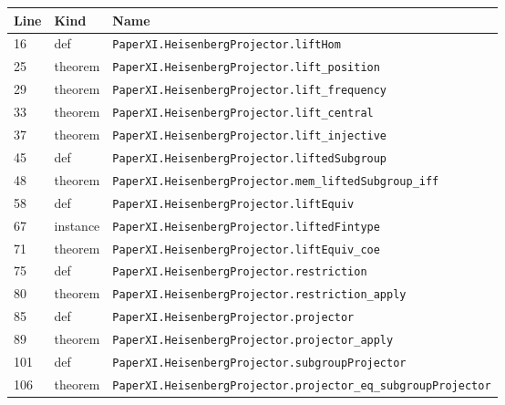 \documentclass[10pt,oneside]{book}
\begin{document}
\begin{longtable}{@{}p{}p{}p{}@{}}\toprule Line&Kind&Name\\\midrule\endhead

16&def&\nolinkurl{PaperXI.HeisenbergProjector.liftHom}\\

25&theorem&\nolinkurl{PaperXI.HeisenbergProjector.lift_position}\\

29&theorem&\nolinkurl{PaperXI.HeisenbergProjector.lift_frequency}\\

33&theorem&\nolinkurl{PaperXI.HeisenbergProjector.lift_central}\\

37&theorem&\nolinkurl{PaperXI.HeisenbergProjector.lift_injective}\\

45&def&\nolinkurl{PaperXI.HeisenbergProjector.liftedSubgroup}\\

48&theorem&\nolinkurl{PaperXI.HeisenbergProjector.mem_liftedSubgroup_iff}\\

58&def&\nolinkurl{PaperXI.HeisenbergProjector.liftEquiv}\\

67&instance&\nolinkurl{PaperXI.HeisenbergProjector.liftedFintype}\\

71&theorem&\nolinkurl{PaperXI.HeisenbergProjector.liftEquiv_coe}\\

75&def&\nolinkurl{PaperXI.HeisenbergProjector.restriction}\\

80&theorem&\nolinkurl{PaperXI.HeisenbergProjector.restriction_apply}\\

85&def&\nolinkurl{PaperXI.HeisenbergProjector.projector}\\

89&theorem&\nolinkurl{PaperXI.HeisenbergProjector.projector_apply}\\

101&def&\nolinkurl{PaperXI.HeisenbergProjector.subgroupProjector}\\

106&theorem&\nolinkurl{PaperXI.HeisenbergProjector.projector_eq_subgroupProjector}\\


\end{longtable}
\end{document}

